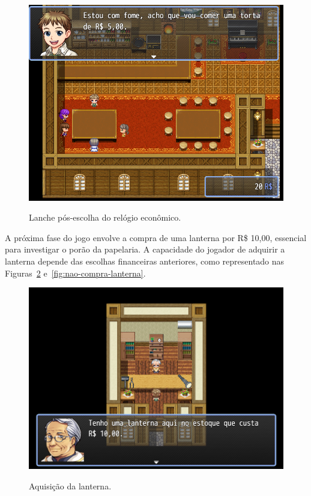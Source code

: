 \begin{figure}[!htbp]
	\centering
	\caption{Lanche pós-escolha do relógio econômico.}
	\includegraphics[scale=0.5]{Textuais/Pictures/lanchonete-pos-relogio.png}
	\label{fig:lanchonete-pos-relogio}
\end{figure}


A próxima fase do jogo envolve a compra de uma lanterna por R\$ 10,00, essencial para investigar o porão da papelaria. A capacidade do jogador de adquirir a lanterna depende das escolhas financeiras anteriores, como representado nas Figuras~\ref{fig:compra-lanterna} e~\ref{fig:nao-compra-lanterna}.

\begin{figure}[!htbp]
	\centering
	\caption{Aquisição da lanterna.}
	\includegraphics[scale=0.5]{Textuais/Pictures/compra-lanterna.png}
	\label{fig:compra-lanterna}
\end{figure}

